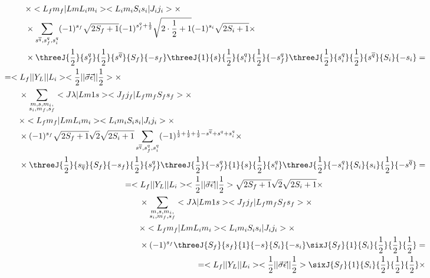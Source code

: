 \begin{align}
\begin{split}
        &\qquad\times <L_f m_f| L m L_i m_i> <L_i m_i S_i s_i| J_i j_i> \times \\
        &\qquad\times \sum_{s^{\overline{q}}, s_{f}^{q}, s_i^q} (-1)^{s_f}\sqrt{2S_f+1} (-1)^{s_f^q + \frac{1}{2}}\sqrt{2 \cdot \frac{1}{2} + 1} (-1)^{s_i} \sqrt{2S_i + 1} \times \\
        &\qquad\times \threeJ{\frac{1}{2}}{s_f^q}{\frac{1}{2}}{s^{\overline{q}}}{S_f}{-s_f} \threeJ{1}{s}{\frac{1}{2}}{s_i^q}{\frac{1}{2}}{-s_f^q} \threeJ{\frac{1}{2}}{s_i^q}{\frac{1}{2}}{s^{\overline{q}}}{S_i}{-s_i}  =
    \end{split}\\
    \begin{split}
        &= <L_f|| Y_L ||L_i> <\frac{1}{2}|| \vec{\sigma}\vec{\epsilon} ||\frac{1}{2}> \times \\
        &\qquad\times \sum_{\substack{m, s, m_i,\\ s_i, m_f, s_f}} <J \lambda| L m 1 s> <J_f j_f| L_f m_f S_f s_f> \times \\
        &\qquad\times <L_f m_f| L m L_i m_i> <L_i m_i S_i s_i| J_i j_i> \times \\
        &\qquad\times (-1)^{s_f}\sqrt{2S_f+1} \sqrt{2} \sqrt{2S_i + 1} \sum_{s^{\overline{q}}, s_{f}^{q}, s_i^q} (-1)^{\frac{1}{2} + \frac{1}{2} + \frac{1}{2} - s^{\overline{q}} + s^q + s_i^q} \times \\
        &\qquad\times \threeJ{\frac{1}{2}}{s_{\overline{q}}}{S_f}{-s_f}{\frac{1}{2}}{s_f^q} \threeJ{\frac{1}{2}}{-s_f^q}{1}{s}{\frac{1}{2}}{s_i^q} \threeJ{\frac{1}{2}}{-s_i^q}{S_i}{s_i}{\frac{1}{2}}{-s^{\overline{q}}}  =
    \end{split}\\
    \begin{split}
        &= <L_f|| Y_L ||L_i> <\frac{1}{2}|| \vec{\sigma}\vec{\epsilon} ||\frac{1}{2}> \sqrt{2S_f+1} \sqrt{2} \sqrt{2S_i + 1} \times \\
        &\qquad\times \sum_{\substack{m, s, m_i,\\ s_i, m_f, s_f}} <J \lambda| L m 1 s> <J_f j_f| L_f m_f S_f s_f> \times \\
        &\qquad\times <L_f m_f| L m L_i m_i> <L_i m_i S_i s_i| J_i j_i> \times \\
        &\qquad\times (-1)^{s_f} \threeJ{S_f}{s_f}{1}{-s}{S_i}{-s_i} \sixJ{S_f}{1}{S_i}{\frac{1}{2}}{\frac{1}{2}}{\frac{1}{2}} =
    \end{split}\\
    \begin{split}
        &= <L_f|| Y_L ||L_i> <\frac{1}{2}|| \vec{\sigma}\vec{\epsilon} ||\frac{1}{2}> \sixJ{S_f}{1}{S_i}{\frac{1}{2}}{\frac{1}{2}}{\frac{1}{2}} \times \\

\end{split}
\end{align}
